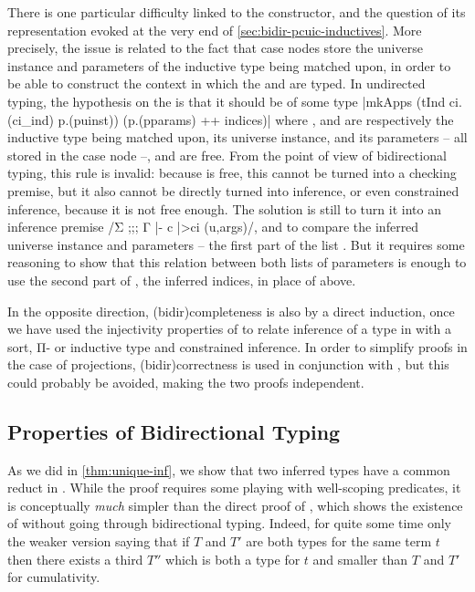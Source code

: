 There is one particular difficulty linked to the  constructor, and the question
of its representation evoked at the very end of \cref{sec:bidir-pcuic-inductives}.
More precisely, the issue is related to the fact that case nodes store the universe
instance and parameters of the inductive type being matched upon, in order to be able to
construct the context in which the  and  are typed.
In undirected typing, the hypothesis on the  is that it should be of some type
\coqline|mkApps (tInd ci.(ci_ind) p.(puinst)) (p.(pparams) ++ indices)|
where ,  and 
are respectively the inductive type being matched upon, its universe instance, and its
parameters – all stored in the case node –, and 
are free. From the point of view of bidirectional typing, this rule is invalid:%
%
because  is free, this cannot be turned into a checking premise, but it also
cannot be directly turned into inference, or even constrained inference, because it is
not free enough.
The solution is still to turn it into an inference premise
\coqe/Σ ;;; Γ |- c |>{ci} (u,args)/, and to compare the inferred universe instance 
and parameters – the first part of the list . But it requires some reasoning to
show that this relation between both lists of parameters is enough to use the second part
of , the inferred indices, in place of  above.

In the opposite direction, \kl(bidir){completeness}%
is also by a direct induction, once we have used
the injectivity properties of  to relate inference of a type
in  with a sort, Π- or inductive type and constrained inference.
In order to simplify proofs in the case of projections, \kl(bidir){correctness} is used in conjunction
with , but this could probably be avoided, making the two proofs independent.

\subsection{Properties of Bidirectional Typing}

As we did in \cref{thm:unique-inf}, we show that two inferred types have a common reduct in
. While the proof requires some playing with
well-scoping predicates,%
it is conceptually \emph{much} simpler than the direct proof of ,
which shows the existence of  without going through bidirectional typing.
Indeed, for quite some time only the weaker version saying that if $T$ and $T'$ are both types
for the same term $t$ then there exists a third $T''$ which is both a type for $t$ and smaller than 
$T$ and $T'$ for cumulativity.

